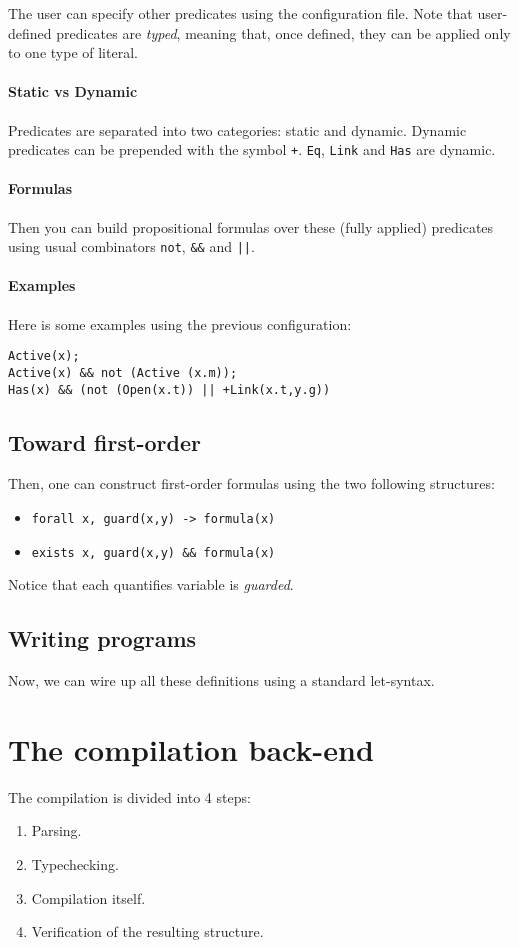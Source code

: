 \documentclass[10pt,a4paper]{article}
\newcommand{\ocaml}{\texttt}
\begin{document}
The user can specify other predicates using the configuration file. Note that user-defined predicates are \emph{typed}, meaning that, once defined, they can be applied only to one type of literal.

\paragraph{Static vs Dynamic}
Predicates are separated into two categories: static and dynamic. Dynamic predicates can be prepended with the symbol \ocaml{+}. \ocaml{Eq}, \ocaml{Link} and \ocaml{Has} are dynamic.

\paragraph{Formulas}
Then you can build propositional formulas over these (fully applied) predicates using usual combinators \ocaml{not}, \ocaml{&&} and \ocaml{||}.

\paragraph{Examples}
Here is some examples using the previous configuration:
\begin{verbatim}
Active(x);
Active(x) && not (Active (x.m));
Has(x) && (not (Open(x.t)) || +Link(x.t,y.g))
\end{verbatim}

\subsection{Toward first-order}
Then, one can construct first-order formulas using the two following structures:
\begin{itemize}
\item \ocaml{forall x, guard(x,y) -> formula(x)}
\item \ocaml{exists x, guard(x,y) && formula(x)}
\end{itemize}
Notice that each quantifies variable is \emph{guarded}.

\subsection{Writing programs}
Now, we can wire up all these definitions using a standard let-syntax.

\section{The compilation back-end}
The compilation is divided into 4 steps:
\begin{enumerate}
\item Parsing.
\item Typechecking.
\item Compilation itself.
\item Verification of the resulting structure.
\end{enumerate}
\end{document}
